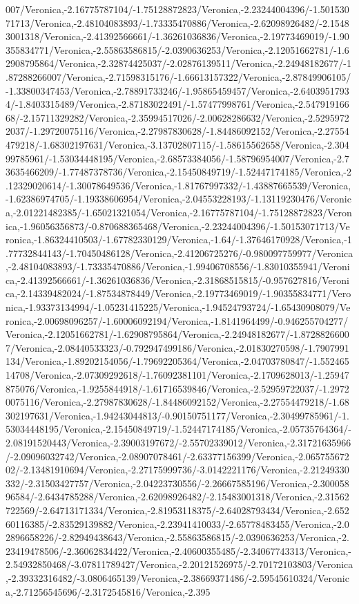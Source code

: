 {\begin{tikzternal}
007/Veronica,-2.16775787104/-1.75128872823/Veronica,-2.23244004396/-1.50153071713/Veronica,-2.48104083893/-1.73335470886/Veronica,-2.62098926482/-2.15483001318/Veronica,-2.41392566661/-1.36261036836/Veronica,-2.19773469019/-1.90355834771/Veronica,-2.55863586815/-2.0390636253/Veronica,-2.12051662781/-1.62908795864/Veronica,-2.32874425037/-2.02876139511/Veronica,-2.24948182677/-1.87288266007/Veronica,-2.71598315176/-1.66613157322/Veronica,-2.87849906105/-1.33800347453/Veronica,-2.78891733246/-1.95865459457/Veronica,-2.64039517934/-1.8403315489/Veronica,-2.87183022491/-1.57477998761/Veronica,-2.54791916668/-2.15711329282/Veronica,-2.35994517026/-2.00628286632/Veronica,-2.52959722037/-1.29720075116/Veronica,-2.27987830628/-1.84486092152/Veronica,-2.27554479218/-1.68302197631/Veronica,-3.13702807115/-1.58615562658/Veronica,-2.30499785961/-1.53034448195/Veronica,-2.68573384056/-1.58796954007/Veronica,-2.73635466209/-1.77487378736/Veronica,-2.15450849719/-1.52447174185/Veronica,-2.12329020614/-1.30078649536/Veronica,-1.81767997332/-1.43887665539/Veronica,-1.62386974705/-1.19338606954/Veronica,-2.04553228193/-1.13119230476/Veronica,-2.01221482385/-1.65021321054/Veronica,-2.16775787104/-1.75128872823/Veronica,-1.96056356873/-0.870688365468/Veronica,-2.23244004396/-1.50153071713/Veronica,-1.86324410503/-1.67782330129/Veronica,-1.64/-1.37646170928/Veronica,-1.77732844143/-1.70450486128/Veronica,-2.41206725276/-0.980097759977/Veronica,-2.48104083893/-1.73335470886/Veronica,-1.99406708556/-1.83010355941/Veronica,-2.41392566661/-1.36261036836/Veronica,-2.31868515815/-0.957627816/Veronica,-2.14339482024/-1.87534878449/Veronica,-2.19773469019/-1.90355834771/Veronica,-1.93373134994/-1.05231415225/Veronica,-1.94524793724/-1.65430908079/Veronica,-2.00698096257/-1.60006092194/Veronica,-1.8141964499/-0.946255704277/Veronica,-2.12051662781/-1.62908795864/Veronica,-2.24948182677/-1.87288266007/Veronica,-2.08440533323/-0.792947499186/Veronica,-2.01830270598/-1.7907991134/Veronica,-1.89202154056/-1.79692205364/Veronica,-2.04703780847/-1.55246514708/Veronica,-2.07309292618/-1.76092381101/Veronica,-2.1709628013/-1.25947875076/Veronica,-1.9255844918/-1.61716539846/Veronica,-2.52959722037/-1.29720075116/Veronica,-2.27987830628/-1.84486092152/Veronica,-2.27554479218/-1.68302197631/Veronica,-1.94243044813/-0.90150751177/Veronica,-2.30499785961/-1.53034448195/Veronica,-2.15450849719/-1.52447174185/Veronica,-2.05735764364/-2.08191520443/Veronica,-2.39003197672/-2.55702339012/Veronica,-2.31721635966/-2.09096032742/Veronica,-2.08907078461/-2.63377156399/Veronica,-2.06575567202/-2.13481910694/Veronica,-2.27175999736/-3.0142221176/Veronica,-2.21249330332/-2.31503427757/Veronica,-2.04223730556/-2.26667585196/Veronica,-2.30005896584/-2.6434785288/Veronica,-2.62098926482/-2.15483001318/Veronica,-2.31562722569/-2.64713171334/Veronica,-2.81953118375/-2.64028793434/Veronica,-2.65260116385/-2.83529139882/Veronica,-2.23941410033/-2.65778483455/Veronica,-2.02896658226/-2.82949438643/Veronica,-2.55863586815/-2.0390636253/Veronica,-2.23419478506/-2.36062834422/Veronica,-2.40600355485/-2.34067743313/Veronica,-2.54932850468/-3.07811789427/Veronica,-2.20121526975/-2.70172103803/Veronica,-2.39332316482/-3.0806465139/Veronica,-2.38669371486/-2.59545610324/Veronica,-2.71256545696/-2.3172545816/Veronica,-2.395
\end{tikzternal}}

